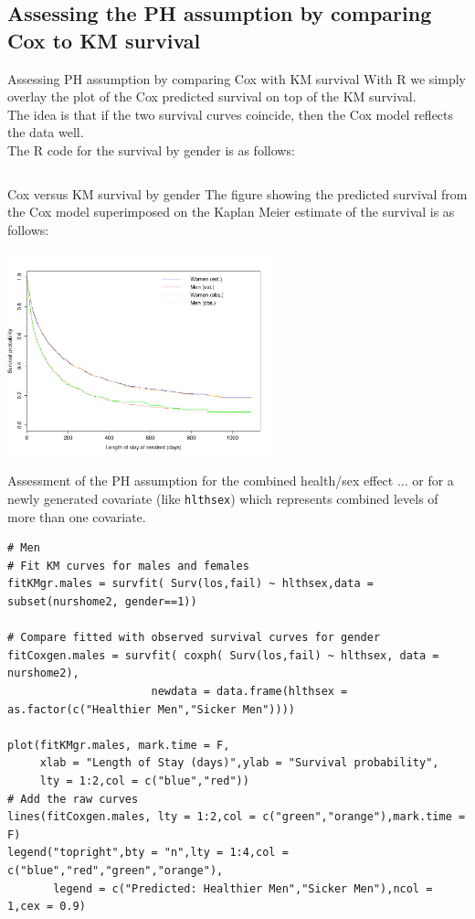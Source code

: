 \documentclass[envcountsect, 10pt, portrait, palatino]{beamer}
\begin{document}
\subsection{Assessing the PH assumption by comparing Cox to KM survival}
\begin{frame}[fragile]{ Assessing PH assumption by comparing Cox with KM survival}
With R we simply overlay the plot of the Cox predicted survival on top of the KM survival.\\[2ex]
The idea is that if the two survival curves coincide, then the Cox model reflects the data well.  
\\[2ex]
The R code for the survival by gender is as follows:

\scriptsize
\begin{verbatim}
\end{verbatim}
\end{frame}
\begin{frame}{Cox versus KM survival by gender}
The figure showing the predicted survival from the Cox model superimposed on the Kaplan Meier estimate of the survival is as follows:
\centerline{\includegraphics[width=3in]{ch12kmph_sex.pdf}}
\end{frame}
\begin{frame}[fragile]{Assessment of the PH assumption for the combined health/sex effect}
\normalsize
... or for a newly generated covariate (like {\tt hlthsex}) which represents combined
levels of more than one covariate.

\scriptsize
\begin{verbatim}
# Men
# Fit KM curves for males and females
fitKMgr.males = survfit( Surv(los,fail) ~ hlthsex,data = subset(nurshome2, gender==1))

# Compare fitted with observed survival curves for gender
fitCoxgen.males = survfit( coxph( Surv(los,fail) ~ hlthsex, data = nurshome2),
                      newdata = data.frame(hlthsex = as.factor(c("Healthier Men","Sicker Men"))))

plot(fitKMgr.males, mark.time = F,
     xlab = "Length of Stay (days)",ylab = "Survival probability",
     lty = 1:2,col = c("blue","red"))
# Add the raw curves
lines(fitCoxgen.males, lty = 1:2,col = c("green","orange"),mark.time = F)
legend("topright",bty = "n",lty = 1:4,col = c("blue","red","green","orange"),
       legend = c("Predicted: Healthier Men","Sicker Men"),ncol = 1,cex = 0.9)
\end{verbatim}
\end{frame}
\end{document}
